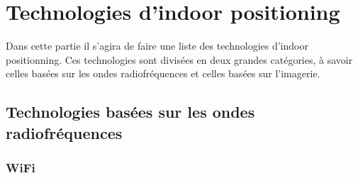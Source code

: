\section{Technologies d'indoor positioning}

Dans cette partie il s'agira de faire une liste des technologies d'indoor positionning. Ces technologies sont divisées en deux grandes catégories, à savoir celles basées sur les ondes radiofréquences et celles basées sur l'imagerie.
\subsection{Technologies basées sur les ondes radiofréquences}


\subsubsection{WiFi}

